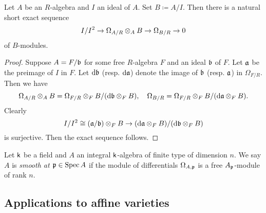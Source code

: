     \begin{theorem}\label{thm: the second exact sequence of differentials}
        Let \(A\) be an \(R\)-algebra and \(I\) an ideal of \(A\).
        Set \(B \coloneqq A/I\).
        Then there is a natural short exact sequence
        \[ I/I^2 \to \Omega_{A/R} \otimes_A B \to \Omega_{B/R} \to 0 \]
        of \(B\)-modules.
    \end{theorem}
    \begin{proof}
        Suppose \(A = F/{\mathfrak{b}}\) for some free \(R\)-algebra \(F\) and an ideal \({\mathfrak{b}}\) of \(F\).
        Let \({\mathfrak{a}}\) be the preimage of \(I\) in \(F\).
        Let \({\mathrm{d}} {\mathfrak{b}}\) (resp. \({\mathrm{d}} {\mathfrak{a}}\)) denote the image of \({\mathfrak{b}}\) (resp. \({\mathfrak{a}}\)) in \(\Omega_{F/R}\).
        Then we have 
        \[ \Omega_{A/R} \otimes_A B = \Omega_{F/R} \otimes_F B / ({\mathrm{d}} {\mathfrak{b}} \otimes_F B), \quad \Omega_{B/R} = \Omega_{F/R} \otimes_F B / ({\mathrm{d}} {\mathfrak{a}} \otimes_F B). \]
        Clearly 
        \[ I/I^2 \cong ({\mathfrak{a}}/{\mathfrak{b}})\otimes_F B \to ({\mathrm{d}} {\mathfrak{a}} \otimes_F B)/({\mathrm{d}} {\mathfrak{b}} \otimes_F B) \]
        is surjective.
        Then the exact sequence follows.
    \end{proof}

    \begin{definition}\label{def: smoothness of affine algebraic varieties}
        Let \({\mathsf{k}}\) be a field and \(A\) an integral \({\mathsf{k}}\)-algebra of finite type of dimension $n$.
        We say \(A\) is \emph{smooth at \({\mathfrak{p}} \in \operatorname{Spec} A\)} if the module of differentials \(\Omega_{A,{\mathfrak{p}}}\) is a free \(A_{\mathfrak{p}}\)-module of rank \(n\).
    \end{definition}


\subsection{Applications to affine varieties}


